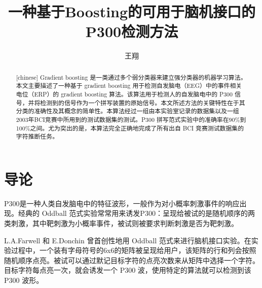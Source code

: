 \documentclass[a4paper]{ecust_thesis_translation}
\author{王\quad 翔}
\title{一种基于Boosting的可用于脑机接口的P300检测方法}
\begin{document}
\setlength{\parindent}{2em}


  \maketitle

  \begin{abstract}[chinese]
  Gradient boosting 是一类通过多个弱分类器来建立强分类器的机器学习算法。本文主要描述了一种基于 gradient boosting 用于检测自发脑电（EEG）中的事件相关电位（ERP）的 gradient boosting 算法。该算法用于检测人的自发脑电中的 P300 信号，并将检测到的信号作为一个拼写装置的原始信号。本文所述方法的关键特性在于其分类的准确性及其概念的简单性。本算法经过一组由本实验室记录的数据集以及一组2003年BCI竞赛中所用到的测试数据集的测试。P300 拼写范式实验中的准确率在90\%到100\%之间。尤为突出的是，本算法完全正确地完成了所有出自 BCI 竞赛测试数据集的字符推断任务。
  \end{abstract}

  \section{导论}

  P300是一种人类自发脑电中的特征波形，一般作为对小概率刺激事件的响应出现。经典的 Oddball 范式实验常常用来诱发P300：呈现给被试的是随机顺序的两类刺激，其中靶刺激为小概率事件，被试则被要求判断刺激是否为靶刺激。

  L.A.Farwell 和 E.Donchin 曾首创性地用 Oddball 范式来进行脑机接口实验。在实验过程中，一个装有字母符号的6x6的矩阵被呈现给用户，该矩阵的行和列会按照随机顺序点亮。被试可以通过默记目标字符的点亮次数来从矩阵中选择一个字符。目标字符每点亮一次，就会诱发一个 P300 波，使用特定的算法就可以检测到该 P300 波形。
\end{document}
